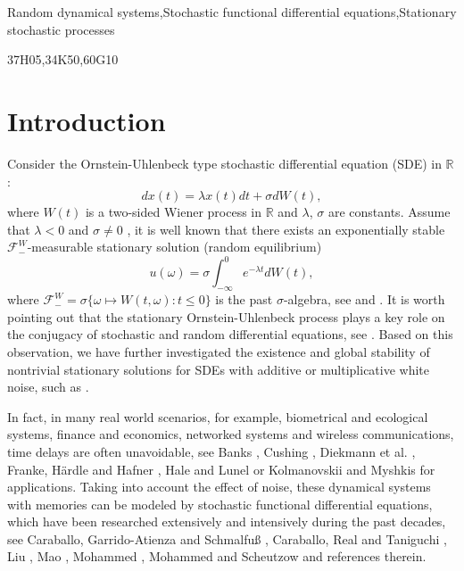 \documentclass[preprint,12pt]{elsarticle}
\begin{document}
\begin{frontmatter}
\begin{keyword}Random dynamical systems\sep Stochastic functional differential equations\sep Stationary stochastic processes


\MSC[2020] 37H05\sep 34K50\sep 60G10
\end{keyword}
\end{frontmatter}


\section{Introduction}
Consider the Ornstein-Uhlenbeck type stochastic differential equation (SDE) in $\mathbb{R}$:
\begin{equation}\label{OU-1}dx(t)=\lambda x(t)dt+\sigma dW(t),
\end{equation}
where $W(t)$ is a two-sided Wiener process in $\mathbb{R}$ and $\lambda$, $\sigma$ are constants. Assume that $\lambda<0$ and $\sigma\neq0$ , it is well known that there exists an exponentially stable $\mathscr{F}_-^W$-measurable stationary solution (random equilibrium)
\begin{equation}\label{OU-2}u(\omega)=\sigma\int_{-\infty}^0e^{-\lambda t}dW(t),\end{equation}
where $\mathscr{F}_-^W=\sigma\{\omega\mapsto W(t,\omega):t\leq0\}$ is the past $\sigma$-algebra, see \cite[Example 2.4.4]{Chu} and \cite[Proposition 3.1]{CS}. It is worth pointing out that the stationary Ornstein-Uhlenbeck process plays a key role on the conjugacy of stochastic and random differential equations, see \cite{DLS,GP,IL,IS}. Based on this observation, we have further investigated the existence and global stability of nontrivial stationary solutions for SDEs with additive or multiplicative white noise, such as \cite{JL1,JL2,Lv}.

In fact, in many real world scenarios, for example, biometrical and ecological systems, finance and economics,
networked systems and wireless communications, time delays are often unavoidable, see Banks \cite{Bank}, Cushing \cite{Cu}, Diekmann et al. \cite{DG}, Franke, H\"{a}rdle and Hafner \cite{FHH}, Hale and Lunel \cite{HL} or Kolmanovskii and Myshkis \cite{KM} for applications. Taking into account the effect of noise, these dynamical systems with memories can be modeled by stochastic functional differential equations, which have been researched extensively and intensively during the past decades, see Caraballo, Garrido-Atienza and Schmalfu{\ss} \cite{CGS}, Caraballo, Real and Taniguchi \cite{CRT},  Liu \cite{L}, Mao \cite{M}, Mohammed \cite{Mo}, Mohammed and Scheutzow \cite{MS1,MS2,MS3} and references therein.
\end{document}

